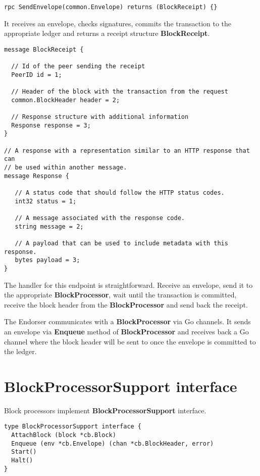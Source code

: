 \begin{lstlisting}
rpc SendEnvelope(common.Envelope) returns (BlockReceipt) {}
\end{lstlisting}

It receives an envelope, checks signatures, commits the transaction to the appropriate ledger and returns a receipt structure \textbf{BlockReceipt}.

\begin{lstlisting}
message BlockReceipt {

  // Id of the peer sending the receipt
  PeerID id = 1;

  // Header of the block with the transaction from the request
  common.BlockHeader header = 2;

  // Response structure with additional information
  Response response = 3;
}

// A response with a representation similar to an HTTP response that can
// be used within another message.
message Response {

   // A status code that should follow the HTTP status codes.
   int32 status = 1;

   // A message associated with the response code.
   string message = 2;

   // A payload that can be used to include metadata with this response.
   bytes payload = 3;
}
\end{lstlisting}

The handler for this endpoint is straightforward. Receive an envelope, send it to the appropriate \textbf{BlockProcessor}, wait until the transaction is committed, receive the block header from the \textbf{BlockProcessor} and send back the receipt.

The Endorser communicates with a \textbf{BlockProcessor} via Go channels.
It sends an envelope via \textbf{Enqueue} method of \textbf{BlockProcessor} and receives back a Go channel where the block header will be sent to once the envelope is committed to the ledger.

\section{BlockProcessorSupport interface}
\label{sec:bp-interface}

Block processors implement \textbf{BlockProcessorSupport} interface.

\begin{lstlisting}
type BlockProcessorSupport interface {
  AttachBlock (block *cb.Block)
  Enqueue (env *cb.Envelope) (chan *cb.BlockHeader, error)
  Start()
  Halt()
}
\end{lstlisting}

